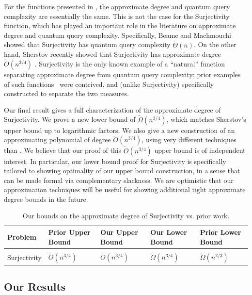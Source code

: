 \documentclass[11pt, letterpaper, fleqn]{article}
\theoremstyle{plain}
\newcommand{\tO}{\tilde{O}}
\newcommand{\tOmega}{\tilde{\Omega}}
\begin{document}
\medskip
For the functions presented in , the approximate degree and quantum query complexity are essentially the same. 
This is not the case for the Surjectivity function, which has played an
important role in the literature on approximate degree and quantum query complexity.
Specifically, Beame and Machmouchi~\cite{beame} showed that Surjectivity has quantum query complexity $\tilde{\Theta}(n)$. On the other hand, Sherstov recently showed that Surjectivity has approximate degree $\tilde{O}(n^{3/4})$ \cite{sherstovpersonal}. 
Surjectivity is the only known example of a ``natural'' function separating approximate degree from quantum query complexity; prior examples of such functions~\cite{ambainissep, cheatsheets} were contrived, and (unlike Surjectivity) specifically constructed to separate the two measures.

Our final result gives a full characterization of the approximate degree of Surjectivity. We prove a new lower bound of $\tilde{\Omega}(n^{3/4})$, which matches Sherstov's upper bound up to logarithmic factors. We also give a new construction of an approximating polynomial of degree $\tilde{O}(n^{3/4})$, using very different techniques than \cite{sherstovpersonal}. We believe that our proof
of this $\tilde{O}(n^{3/4})$ upper bound is of independent interest. In particular,
our lower bound proof for Surjectivity is specifically tailored to showing 
optimality of our upper bound construction, in
a sense that can be made formal via complementary slackness. 
We are optimistic that our approximation techniques will be
useful for showing additional tight approximate degree bounds in the future.


\setlength{\tabcolsep}{8pt}
\renewcommand{\arraystretch}{1.3}
\begin{table}
\centering
{\small
\begin{tabular}{ l l l l l }
\hline
Problem  & Prior Upper Bound & Our Upper Bound & Our Lower Bound & Prior Lower Bound\\
\hline
& & & &\\[-12pt] 
Surjectivity & $\tO(n^{3/4})$ \cite{sherstovpersonal} & $\tO(n^{3/4})$ &$\tOmega(n^{3/4})$ & $\tilde{\Omega}(n^{2/3})$ \cite{aaronsonshi} \\[3pt]
\hline
\end{tabular}
\caption{Our bounds on the approximate degree of Surjectivity vs. prior work.}
\label{tab:summary2}
}
\end{table}

\subsection{Our Results}
\label{sec:results}
\end{document}
